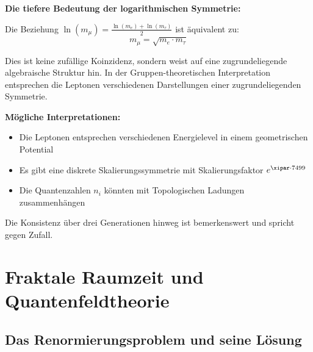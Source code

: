 	\begin{abhandlung}
		\textbf{Die tiefere Bedeutung der logarithmischen Symmetrie:}
		
		Die Beziehung $\ln(m_\mu) = \frac{\ln(m_e) + \ln(m_\tau)}{2}$ ist äquivalent zu:
		\begin{equation}
			m_\mu = \sqrt{m_e \cdot m_\tau}
		\end{equation}
		
		Dies ist keine zufällige Koinzidenz, sondern weist auf eine zugrundeliegende algebraische Struktur hin. In der Gruppen-theoretischen Interpretation entsprechen die Leptonen verschiedenen Darstellungen einer zugrundeliegenden Symmetrie.
		
		\textbf{Mögliche Interpretationen:}
		\begin{itemize}
			\item Die Leptonen entsprechen verschiedenen Energielevel in einem geometrischen Potential
			\item Es gibt eine diskrete Skalierungssymmetrie mit Skalierungsfaktor $e^{\xipar \cdot 7499}$
			\item Die Quantenzahlen $n_i$ könnten mit Topologischen Ladungen zusammenhängen
		\end{itemize}
		
		Die Konsistenz über drei Generationen hinweg ist bemerkenswert und spricht gegen Zufall.
	\end{abhandlung}
	
	\section{Fraktale Raumzeit und Quantenfeldtheorie}
	
	\subsection{Das Renormierungsproblem und seine Lösung}
	
